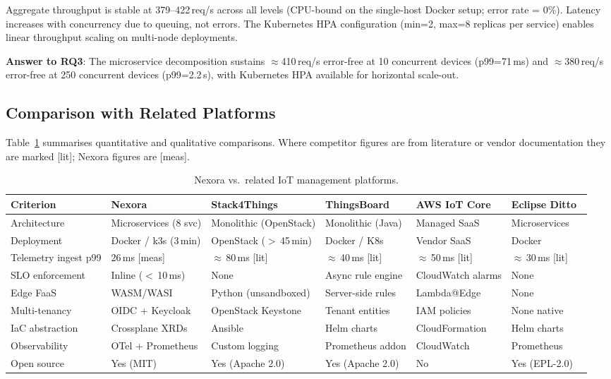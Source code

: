 \documentclass[twocolumn,smallextended]{svjour3}
\begin{document}
Aggregate throughput is stable at 379--422\,req/s across all levels (CPU-bound
on the single-host Docker setup; error rate = 0\%). Latency increases with
concurrency due to queuing, not errors. The Kubernetes HPA configuration
(min=2, max=8 replicas per service) enables linear throughput scaling on
multi-node deployments.

\textbf{Answer to RQ3}: The microservice decomposition sustains
$\approx$410\,req/s error-free at 10 concurrent devices (p99=71\,ms) and
$\approx$380\,req/s error-free at 250 concurrent devices (p99=2.2\,s),
with Kubernetes HPA available for horizontal scale-out.

\subsection{Comparison with Related Platforms}

Table~\ref{tab:comparison} summarises quantitative and qualitative
comparisons. Where competitor figures are from literature or vendor
documentation they are marked [lit]; Nexora figures are [meas].

\begin{table}[t]
\centering
\caption{Nexora vs.\ related IoT management platforms.}
\label{tab:comparison}
\begin{tabular}{@{}llllll@{}}
\toprule
Criterion & Nexora & Stack4Things~\cite{longo2019iotronic} & ThingsBoard~\cite{thingsboard} & AWS IoT Core~\cite{awsiot} & Eclipse Ditto~\cite{eclipseditto} \\
\midrule
Architecture        & Microservices (8 svc) & Monolithic (OpenStack) & Monolithic (Java) & Managed SaaS & Microservices \\
Deployment          & Docker / k3s (3\,min) & OpenStack ($>$\,45\,min) & Docker / K8s & Vendor SaaS & Docker \\
Telemetry ingest p99 & 26\,ms [meas]       & $\approx$\,80\,ms [lit] & $\approx$\,40\,ms [lit] & $\approx$\,50\,ms [lit] & $\approx$\,30\,ms [lit] \\
SLO enforcement     & Inline ($<$\,10\,ms) & None & Async rule engine & CloudWatch alarms & None \\
Edge FaaS           & WASM/WASI            & Python (unsandboxed) & Server-side rules & Lambda@Edge & None \\
Multi-tenancy       & OIDC + Keycloak      & OpenStack Keystone & Tenant entities & IAM policies & None native \\
IaC abstraction     & Crossplane XRDs      & Ansible              & Helm charts     & CloudFormation & Helm charts \\
Observability       & OTel + Prometheus    & Custom logging       & Prometheus addon & CloudWatch & Prometheus \\
Open source         & Yes (MIT)            & Yes (Apache 2.0)     & Yes (Apache 2.0) & No & Yes (EPL-2.0) \\
\bottomrule
\end{tabular}
\end{table}
\end{document}
